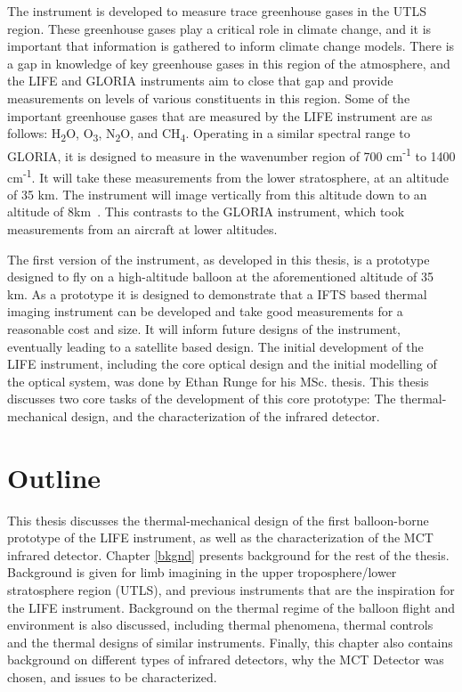 The instrument is developed to measure trace greenhouse gases in the UTLS region. These greenhouse gases play a critical role in climate change, and it is important that information is gathered to inform climate change models. There is a gap in knowledge of key greenhouse gases in this region of the atmosphere, and the LIFE and GLORIA instruments aim to close that gap and provide measurements on levels of various constituents in this region. Some of the important greenhouse gases that are measured by the LIFE instrument are as follows: H\textsubscript{2}O, O\textsubscript{3}, N\textsubscript{2}O, and CH\textsubscript{4}. Operating in a similar spectral range to GLORIA, it is designed to measure in the wavenumber region of 700 cm\textsuperscript{-1} to 1400 cm\textsuperscript{-1}. It will take these measurements from the lower stratosphere, at an altitude of 35 km. The instrument will image vertically from this altitude down to an altitude of 8km~\citep{ethans_thesis}. This contrasts to the GLORIA instrument, which took measurements from an aircraft at lower altitudes.

The first version of the instrument, as developed in this thesis, is a prototype designed to fly on a high-altitude balloon at the aforementioned altitude of 35 km. As a prototype it is designed to demonstrate that a IFTS based thermal imaging instrument can be developed and take good measurements for a reasonable cost and size. It will inform future designs of the instrument, eventually leading to a satellite based design. The initial development of the LIFE instrument, including the core optical design and the initial modelling of the optical system, was done by Ethan Runge for his MSc. thesis. This thesis discusses two core tasks of the development of this core prototype: The thermal-mechanical design, and the characterization of the infrared detector.

\section{Outline}
This thesis discusses the thermal-mechanical design of the first balloon-borne prototype of the LIFE instrument, as well as the characterization of the MCT infrared detector. Chapter \ref{bkgnd} presents background for the rest of the thesis. Background is given for limb imagining in the upper troposphere/lower stratosphere region (UTLS), and previous instruments that are the inspiration for the LIFE instrument. Background on the thermal regime of the balloon flight and environment is also discussed, including thermal phenomena, thermal controls and the thermal designs of similar instruments. Finally, this chapter also contains background on different types of infrared detectors, why the MCT Detector was chosen, and issues to be characterized.

